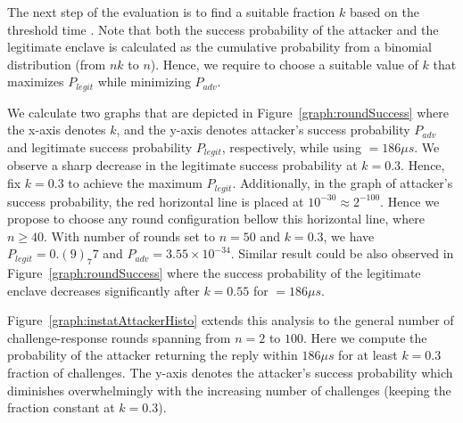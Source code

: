  The next step of the evaluation is to find a suitable fraction $k$ based on the threshold time \connect. Note that both the success probability of the attacker and the legitimate enclave is calculated as the cumulative probability from a binomial distribution (from $nk$ to $n$). Hence, we require to choose a suitable value of $k$ that maximizes $P_{legit}$ while minimizing $P_{adv}$.

We calculate two graphs that are depicted in Figure~\ref{graph:roundSuccess} where the x-axis denotes $k$, and the y-axis denotes attacker's success probability $P_{adv}$ and legitimate success probability $P_{legit}$, respectively, while using \connect$=186 \mu s$. We observe a sharp decrease in the legitimate success probability at $k=0.3$. Hence, fix $k=0.3$ to achieve the maximum $P_{legit}$. Additionally, in the graph of attacker's success probability, the red horizontal line is placed at $10^{-30} \approx 2^{-100}$. Hence we propose to choose any round configuration bellow this horizontal line, where $n \geq 40$. With number of rounds set to $n=50$ and $k=0.3$, we have $P_{legit}=0.(9)_7 7$ and $P_{adv}=3.55\times 10^{-34}$. Similar result could be also observed in Figure~\ref{graph:roundSuccess} where the success probability of the legitimate enclave decreases significantly after $k=0.55$ for \connect$=186\mu s$.



 Figure~\ref{graph:instatAttackerHisto} extends this analysis to the general number of challenge-response rounds spanning from $n=2$ to $100$. Here we compute the probability of the attacker returning the reply within $186 \mu s$ for at least $k=0.3$ fraction of challenges. The y-axis denotes the attacker's success probability which diminishes overwhelmingly with the increasing number of challenges (keeping the fraction constant at $k=0.3$). 



